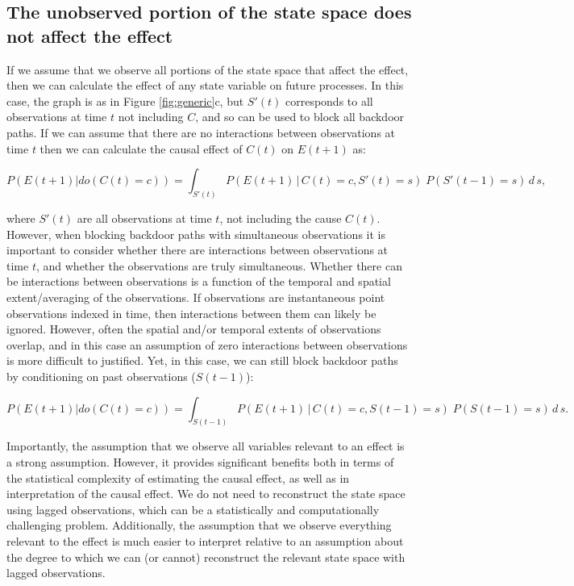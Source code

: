 \documentclass[12pt]{article}
\begin{document}
\subsection{The unobserved portion of the state space does not affect
  the effect}
\label{sec:observ-port-state}

If we assume that we observe all portions of the state space that
affect the effect, then we can calculate the effect of any state
variable on future processes. In this case, the graph is as in Figure
\ref{fig:generic}c, but $S'(t)$ corresponds to all observations at
time $t$ not including $C$, and so can be used to block all backdoor
paths. If we can assume that there are no interactions between
observations at time $t$ then we can calculate the causal effect of
$C(t)$ on $E(t+1)$ as:

\begin{equation} P(E(t+1)| do(C(t)=c)) = \int_{S'(t)} P(E(t+1) \, | \,
  C(t)=c, S'(t) = s )\; P(S'(t-1)=s) \, d \, s,
\end{equation}

where $S'(t)$ are all observations at time $t$, not including the
cause $C(t)$. However, when blocking backdoor paths with simultaneous
observations it is important to consider whether there are
interactions between observations at time $t$, and whether the
observations are truly simultaneous. Whether there can be interactions
between observations is a function of the temporal and spatial
extent/averaging of the observations. If observations are
instantaneous point observations indexed in time, then interactions
between them can likely be ignored. However, often the spatial and/or
temporal extents of observations overlap, and in this case an
assumption of zero interactions between observations is more difficult
to justified. Yet, in this case, we can still block backdoor paths by
conditioning on past observations ($S(t-1)$):

\begin{equation} P(E(t+1)| do(C(t)=c)) = \int_{S(t-1)} P(E(t+1) \, |
  \, C(t)=c, S(t-1) = s )\; P(S(t-1)=s) \, d \, s.
\end{equation}

Importantly, the assumption that we observe all variables relevant to
an effect is a strong assumption. However, it provides significant
benefits both in terms of the statistical complexity of estimating the
causal effect, as well as in interpretation of the causal effect. We
do not need to reconstruct the state space using lagged observations,
which can be a statistically and computationally challenging
problem. Additionally, the assumption that we observe everything
relevant to the effect is much easier to interpret relative to an
assumption about the degree to which we can (or cannot) reconstruct
the relevant state space with lagged observations.
\end{document}
